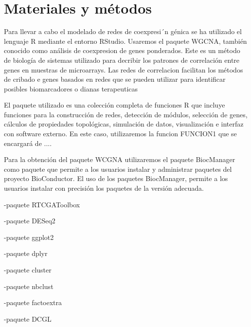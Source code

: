 
	\section{Materiales y métodos}
	
	Para llevar a cabo el modelado de redes de coexpresi´n génica se ha utilizado el lenguaje R mediante el entorno RStudio. Usaremos el paquete WGCNA, también conocido como análisis de coexpresion de genes ponderados. Este es un método de biología de sistemas utilizado para decribir los patrones de correlación entre genes en muestras de microarrays. Las redes de correlacion facilitan los métodos de cribado e genes basados en redes que se pueden utilizar para identificar posibles biomarcadores o dianas terapeuticas
	
	El paquete utilizado es una colección completa de funciones R que incluye funciones para la construcción de redes, detección de módulos, selección de genes, cálculos de propiedades topológicas, simulación de datos, visualización e interfaz con software externo. En este caso, utilizaremos la funcion FUNCION1 que se encargará de ....
	
	Para la obtención del paquete WCGNA utilizaremos el paquete BiocManager como paquete que permite a los usuarios instalar y administrar paquetes del proyecto BioConductor. El uso de los paquetes BiocManager, permite a los usuarios instalar con precisión los paquetes de la versión adecuada.
	
	-paquete RTCGAToolbox
	
	-paquete DESeq2
	
	-paquete ggplot2
	
	-paquete dplyr
	
	-paquete cluster
	
	-paquete nbclust
	
	-paquete factoextra
	
	-paquete DCGL
	


